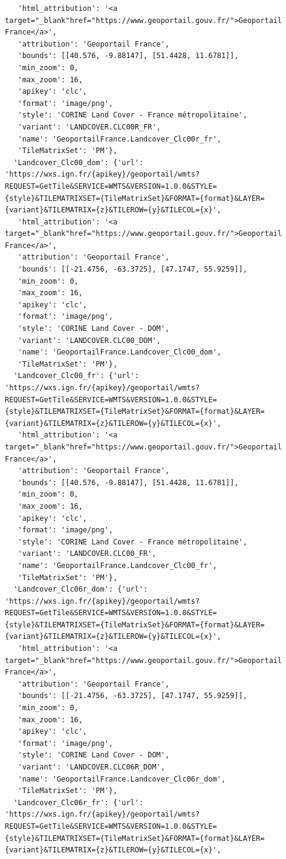 \documentclass[
  letterpaper,
  DIV=11,
  numbers=noendperiod]{scrreprt}
\begin{document}
\begin{verbatim}
   'html_attribution': '<a target="_blank"href="https://www.geoportail.gouv.fr/">Geoportail France</a>',
   'attribution': 'Geoportail France',
   'bounds': [[40.576, -9.88147], [51.4428, 11.6781]],
   'min_zoom': 0,
   'max_zoom': 16,
   'apikey': 'clc',
   'format': 'image/png',
   'style': 'CORINE Land Cover - France métropolitaine',
   'variant': 'LANDCOVER.CLC00R_FR',
   'name': 'GeoportailFrance.Landcover_Clc00r_fr',
   'TileMatrixSet': 'PM'},
  'Landcover_Clc00_dom': {'url': 'https://wxs.ign.fr/{apikey}/geoportail/wmts?REQUEST=GetTile&SERVICE=WMTS&VERSION=1.0.0&STYLE={style}&TILEMATRIXSET={TileMatrixSet}&FORMAT={format}&LAYER={variant}&TILEMATRIX={z}&TILEROW={y}&TILECOL={x}',
   'html_attribution': '<a target="_blank"href="https://www.geoportail.gouv.fr/">Geoportail France</a>',
   'attribution': 'Geoportail France',
   'bounds': [[-21.4756, -63.3725], [47.1747, 55.9259]],
   'min_zoom': 0,
   'max_zoom': 16,
   'apikey': 'clc',
   'format': 'image/png',
   'style': 'CORINE Land Cover - DOM',
   'variant': 'LANDCOVER.CLC00_DOM',
   'name': 'GeoportailFrance.Landcover_Clc00_dom',
   'TileMatrixSet': 'PM'},
  'Landcover_Clc00_fr': {'url': 'https://wxs.ign.fr/{apikey}/geoportail/wmts?REQUEST=GetTile&SERVICE=WMTS&VERSION=1.0.0&STYLE={style}&TILEMATRIXSET={TileMatrixSet}&FORMAT={format}&LAYER={variant}&TILEMATRIX={z}&TILEROW={y}&TILECOL={x}',
   'html_attribution': '<a target="_blank"href="https://www.geoportail.gouv.fr/">Geoportail France</a>',
   'attribution': 'Geoportail France',
   'bounds': [[40.576, -9.88147], [51.4428, 11.6781]],
   'min_zoom': 0,
   'max_zoom': 16,
   'apikey': 'clc',
   'format': 'image/png',
   'style': 'CORINE Land Cover - France métropolitaine',
   'variant': 'LANDCOVER.CLC00_FR',
   'name': 'GeoportailFrance.Landcover_Clc00_fr',
   'TileMatrixSet': 'PM'},
  'Landcover_Clc06r_dom': {'url': 'https://wxs.ign.fr/{apikey}/geoportail/wmts?REQUEST=GetTile&SERVICE=WMTS&VERSION=1.0.0&STYLE={style}&TILEMATRIXSET={TileMatrixSet}&FORMAT={format}&LAYER={variant}&TILEMATRIX={z}&TILEROW={y}&TILECOL={x}',
   'html_attribution': '<a target="_blank"href="https://www.geoportail.gouv.fr/">Geoportail France</a>',
   'attribution': 'Geoportail France',
   'bounds': [[-21.4756, -63.3725], [47.1747, 55.9259]],
   'min_zoom': 0,
   'max_zoom': 16,
   'apikey': 'clc',
   'format': 'image/png',
   'style': 'CORINE Land Cover - DOM',
   'variant': 'LANDCOVER.CLC06R_DOM',
   'name': 'GeoportailFrance.Landcover_Clc06r_dom',
   'TileMatrixSet': 'PM'},
  'Landcover_Clc06r_fr': {'url': 'https://wxs.ign.fr/{apikey}/geoportail/wmts?REQUEST=GetTile&SERVICE=WMTS&VERSION=1.0.0&STYLE={style}&TILEMATRIXSET={TileMatrixSet}&FORMAT={format}&LAYER={variant}&TILEMATRIX={z}&TILEROW={y}&TILECOL={x}',

\end{verbatim}
\end{document}
